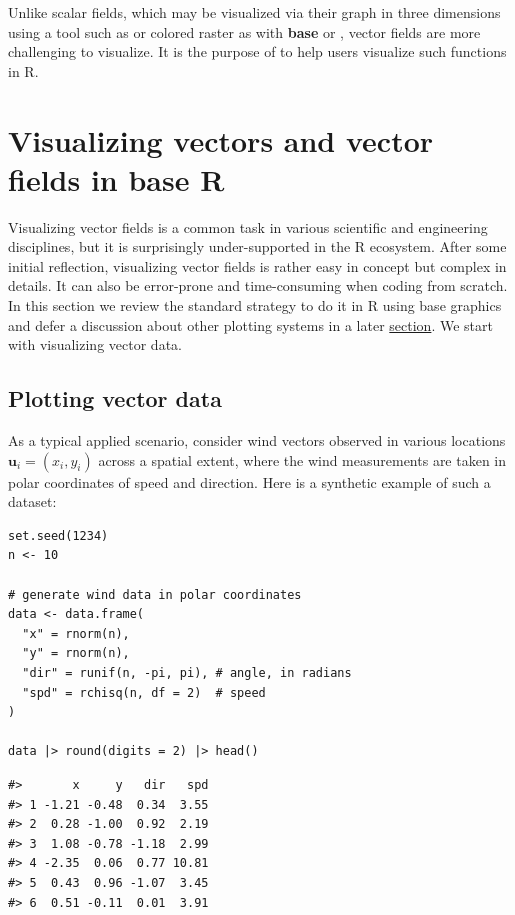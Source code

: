 Unlike scalar fields, which may be visualized via their graph in three dimensions using a tool such as  \citep{plotly} or colored raster as with \textbf{base} or , vector fields are more challenging to visualize. It is the purpose of  to help users visualize such functions in R.

\section{Visualizing vectors and vector fields in base R}\label{sec:visualizing-vectors}

Visualizing vector fields is a common task in various scientific and engineering disciplines, but it is surprisingly under-supported in the R ecosystem. After some initial reflection, visualizing vector fields is rather easy in concept but complex in details. It can also be error-prone and time-consuming when coding from scratch. In this section we review the standard strategy to do it in R using base graphics and defer a discussion about other plotting systems in a later \hyperref[sec:related]{section}. We start with visualizing vector data.

\subsection{Plotting vector data}\label{plotting-vector-data}

As a typical applied scenario, consider wind vectors observed in various locations \(\mathbf{u}_{i} = (x_{i}, y_{i})\) across a spatial extent, where the wind measurements are taken in polar coordinates of speed and direction. Here is a synthetic example of such a dataset:

\begin{verbatim}
set.seed(1234)
n <- 10

# generate wind data in polar coordinates
data <- data.frame(
  "x" = rnorm(n), 
  "y" = rnorm(n),
  "dir" = runif(n, -pi, pi), # angle, in radians
  "spd" = rchisq(n, df = 2)  # speed
)

data |> round(digits = 2) |> head()
\end{verbatim}

\begin{verbatim}
#>       x     y   dir   spd
#> 1 -1.21 -0.48  0.34  3.55
#> 2  0.28 -1.00  0.92  2.19
#> 3  1.08 -0.78 -1.18  2.99
#> 4 -2.35  0.06  0.77 10.81
#> 5  0.43  0.96 -1.07  3.45
#> 6  0.51 -0.11  0.01  3.91
\end{verbatim}

